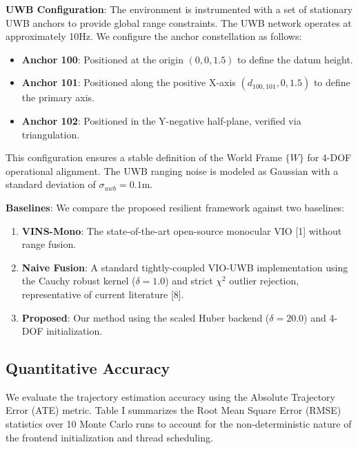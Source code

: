 \documentclass[conference]{IEEEtran}
\begin{document}
\textbf{UWB Configuration}:
The environment is instrumented with a set of stationary UWB anchors to provide global range constraints. The UWB network operates at approximately 10Hz. We configure the anchor constellation as follows:
\begin{itemize}
    \item \textbf{Anchor 100}: Positioned at the origin $(0, 0, 1.5)$ to define the datum height.
    \item \textbf{Anchor 101}: Positioned along the positive X-axis $(d_{100,101}, 0, 1.5)$ to define the primary axis.
    \item \textbf{Anchor 102}: Positioned in the Y-negative half-plane, verified via triangulation.
\end{itemize}
This configuration ensures a stable definition of the World Frame $\{W\}$ for 4-DOF operational alignment. The UWB ranging noise is modeled as Gaussian with a standard deviation of $\sigma_{uwb} = 0.1\text{m}$.

\textbf{Baselines}:
We compare the proposed resilient framework against two baselines:
\begin{enumerate}
    \item \textbf{VINS-Mono}: The state-of-the-art open-source monocular VIO [1] without range fusion.
    \item \textbf{Naive Fusion}: A standard tightly-coupled VIO-UWB implementation using the Cauchy robust kernel ($\delta=1.0$) and strict $\chi^2$ outlier rejection, representative of current literature [8].
    \item \textbf{Proposed}: Our method using the scaled Huber backend ($\delta=20.0$) and 4-DOF initialization.
\end{enumerate}

\subsection{Quantitative Accuracy}
We evaluate the trajectory estimation accuracy using the Absolute Trajectory Error (ATE) metric. Table I summarizes the Root Mean Square Error (RMSE) statistics over 10 Monte Carlo runs to account for the non-deterministic nature of the frontend initialization and thread scheduling.
\end{document}
